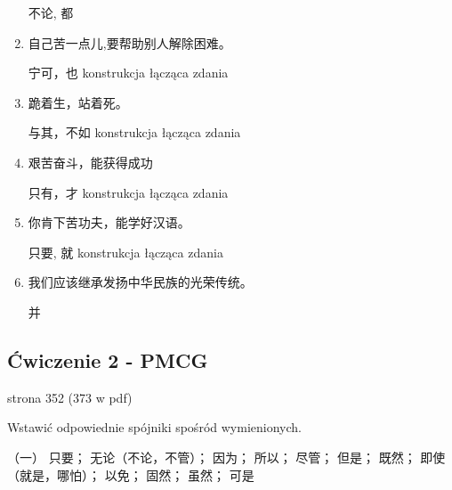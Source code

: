 \begin{enumerate}
不论, 都
\item {}自己苦一点儿,要帮助别人解除困难。%

宁可，也 konstrukcja łącząca zdania
\item {}跪着生，站着死。 %

与其，不如 konstrukcja łącząca zdania
\item {}艰苦奋斗，能获得成功 %

只有，才 konstrukcja łącząca zdania
\item 你肯下苦功夫，能学好汉语。 %

只要, 就 konstrukcja łącząca zdania
\item 我们应该继承发扬中华民族的光荣传统。 %

并
\end{enumerate}

\subsection{Ćwiczenie 2 - PMCG}

strona 352 (373 w pdf)

Wstawić odpowiednie spójniki spośród wymienionych.

（一） 只要； 无论（不论，不管）； 因为； 所以； 尽管； 但是； 既然； 即使 （就是，哪怕）； 以免； 固然； 虽然； 可是

